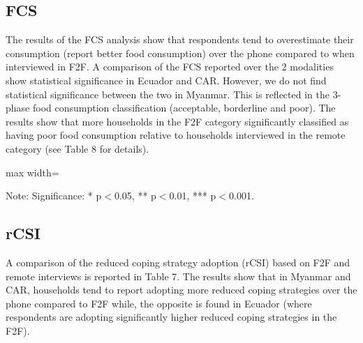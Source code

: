 \documentclass[11pt,harvard]{article}
\begin{document}
\clearpage

\subsection{FCS}

The results of the FCS analysis show that respondents tend to overestimate their consumption (report better food consumption) over the phone compared to when interviewed in F2F. A comparison of the FCS reported over the 2 modalities show statistical significance in Ecuador and CAR. However, we do not find statistical significance between the two in Myanmar. 
This is reflected in the 3-phase food consumption classification (acceptable, borderline and poor). The results show that more households in the F2F category significantly classified as having poor food consumption relative to households interviewed in the remote category (see Table 8 for details). 

	\begin{table}[htbp]
		\centering
		\begin{adjustbox}{max width=\textwidth}
			\begin{threeparttable}
				\caption{Impact of Survey Modality on Food Consumption Score and Groups}
				\scriptsize
				 
				\label{tab:FCS_Modality_All_Country}
				\begin{tablenotes}
					\item Note: Significance: * p$<$0.05, ** p$<$0.01, *** p$<$0.001. 
				\end{tablenotes}
			\end{threeparttable}
		\end{adjustbox}
	\end{table}
	
		\pagebreak
		
\subsection{rCSI}

A comparison of the reduced coping strategy adoption (rCSI) based on F2F and remote interviews is reported in Table 7. The results show that in Myanmar and CAR, households tend to report adopting more reduced coping strategies over the phone compared to F2F while, the opposite is found in Ecuador (where respondents are adopting significantly higher reduced coping strategies in the F2F).
\end{document}
